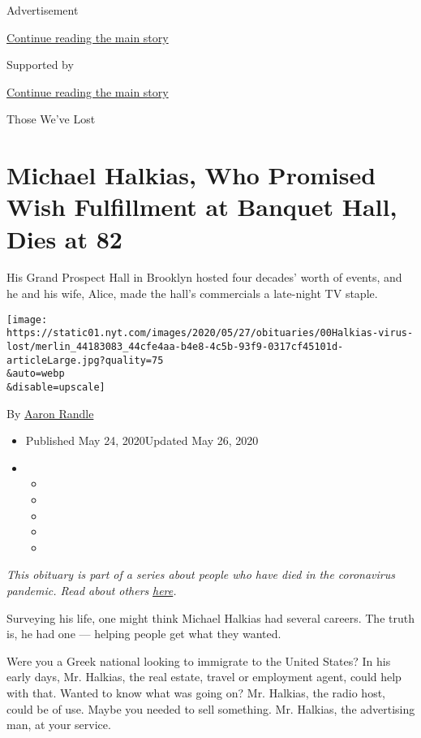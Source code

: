 Advertisement

\protect\hyperlink{after-top}{Continue reading the main story}

Supported by

\protect\hyperlink{after-sponsor}{Continue reading the main story}

Those We've Lost

\hypertarget{michael-halkias-who-promised-wish-fulfillment-at-banquet-hall-dies-at-82}{%
\section{Michael Halkias, Who Promised Wish Fulfillment at Banquet Hall,
Dies at
82}\label{michael-halkias-who-promised-wish-fulfillment-at-banquet-hall-dies-at-82}}

His Grand Prospect Hall in Brooklyn hosted four decades' worth of
events, and he and his wife, Alice, made the hall's commercials a
late-night TV staple.

\texttt{[image: https://static01.nyt.com/images/2020/05/27/obituaries/00Halkias-virus-lost/merlin\_44183083\_44cfe4aa-b4e8-4c5b-93f9-0317cf45101d-articleLarge.jpg?quality=75\\\&auto=webp\\\&disable=upscale]}

By \href{https://www.nytimes.com/by/aaron-randle}{Aaron Randle}

\begin{itemize}
\item
  Published May 24, 2020Updated May 26, 2020
\item
  \begin{itemize}
  \item
  \item
  \item
  \item
  \item
  \end{itemize}
\end{itemize}

\emph{This obituary is part of a series about people who have died in
the coronavirus pandemic. Read about others}
\href{https://www.nytimes.com/series/people-who-have-died-of-the-coronavirus}{\emph{here}}\emph{.}

Surveying his life, one might think Michael Halkias had several careers.
The truth is, he had one --- helping people get what they wanted.

Were you a Greek national looking to immigrate to the United States? In
his early days, Mr. Halkias, the real estate, travel or employment
agent, could help with that. Wanted to know what was going on? Mr.
Halkias, the radio host, could be of use. Maybe you needed to sell
something. Mr. Halkias, the advertising man, at your service.

